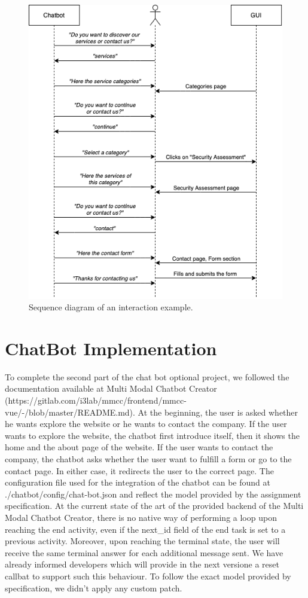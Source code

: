 \documentclass[12pt]{report}
\begin{document}
\begin{figure}[h]
	\centering
	\includegraphics[width=\textwidth]{sequence-diagram}
	\caption{Sequence diagram of an interaction example.}
	\label{fig:sequence-diagram}
\end{figure}

\chapter{ChatBot Implementation} 
To complete the second part of the chat bot optional project, we followed the documentation available at Multi Modal Chatbot Creator (https://gitlab.com/i3lab/mmcc/frontend/mmcc-vue/-/blob/master/README.md).
At the beginning, the user is asked whether he wants explore the website or he wants to contact the company. 
If the user wants to explore the website, the chatbot first introduce itself, then it shows the home and the about page of the website.
If the user wants to contact the company, the chatbot asks whether the user want to fulfill a form or go to the contact page. In either case, 
it redirects the user to the correct page. The configuration file used for the integration of the chatbot can be found at ./chatbot/config/chat-bot.json and reflect the model provided by the assignment specification.
At the current state of the art of the provided backend of the Multi Modal Chatbot Creator, there is no native way of performing a loop upon reaching the end activity, even if the next\_id field of the 
end task is set to a previous activity. Moreover, upon reaching the terminal state, the user will receive the same terminal answer for each additional message sent. We have already informed developers which 
will provide in the next versione a reset callbat to support such this behaviour. To follow the exact model provided by specification, we didn't apply any custom patch.
\end{document}

